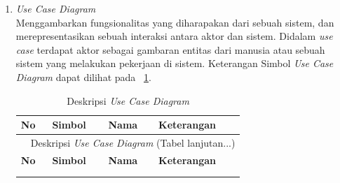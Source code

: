 \begin{enumerate}
	\item \textit{Use Case Diagram} \\
	      Menggambarkan fungsionalitas yang diharapakan dari sebuah sistem, dan merepresentasikan sebuah interaksi antara aktor dan sistem. Didalam \textit{use case} terdapat aktor sebagai gambaran entitas dari manusia atau sebuah sistem yang melakukan pekerjaan di sistem. Keterangan Simbol \textit{Use Case Diagram} dapat dilihat pada \tab~\ref{tab21}.

	      {
	      \fontsize{10}{13}\selectfont
	      \vspace{-0.5em}
	      \begin{longtable}{p{0.5cm} p{2cm} p{2.5cm} p{7.4cm}}
		      \caption{Deskripsi \textit{Use Case Diagram}}
		      \label{tab21}                                                                                                                                                                                                                                                                                                                     \\
		      \hline
		      \textbf{No} & \textbf{Simbol}                                                                                                & \textbf{Nama}           & \textbf{Keterangan}                                                                                                                                                      \\
		      \hline
		      \endfirsthead

		      \multicolumn{4}{c}{\tablename\ \thetable\ {Deskripsi \textit{Use Case Diagram} \space (Tabel lanjutan...)}}                                                                                                                                                                                                                       \\
		      \hline
		      \textbf{No} & \textbf{Simbol}                                                                                                & \textbf{Nama}           & \textbf{Keterangan}                                                                                                                                                      \\
		      \hline                                                                                                                                                                                                                                                                                                                            \\
		      \endhead
		      \hline
		      \endfoot


\end{longtable}}
\end{enumerate}

